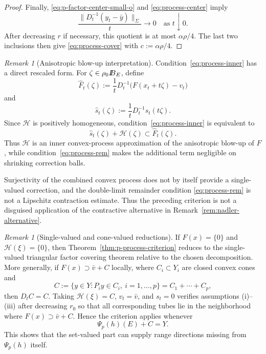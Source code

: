 \documentclass[11pt]{amsart}
\theoremstyle{definition}
\theoremstyle{remark}
\newtheorem{remark}[theorem]{Remark}
\newcommand{\by}{\bar y}
\newcommand{\bv}{\bar v}
\def\ball{{I\kern -.35em B}}
\begin{document}
\begin{proof}
		Finally, \eqref{eq:p-factor-center-small-o} and
		\eqref{eq:process-center} imply
		$$
		\frac{\|D_t^{-1}(y_t-\by)\|_{\Sigma}}{t}\to0
		\quad\text{as }t\downarrow0.
		$$
		After decreasing $r$ if necessary, this quotient is at most
		$\alpha\rho/4$.  The last two inclusions then give
		\eqref{eq:process-cover} with $c:=\alpha\rho/4$.
	\end{proof}
	
	\begin{remark}[Anisotropic blow-up interpretation]
		Condition~\eqref{eq:process-inner} has a direct rescaled form. For
		$\zeta\in\rho_0\ball_E$, define
		$$
		\widehat F_t(\zeta)
		:=
		\frac{1}{t}D_t^{-1}\bigl(F(x_t+t\zeta)-v_t\bigr)
		$$
		and
		$$
		\widehat s_t(\zeta)
		:=
		\frac{1}{t}D_t^{-1}s_t(t\zeta).
		$$
		Since $\mathcal H$ is positively homogeneous,
		condition~\eqref{eq:process-inner} is equivalent to
		$$
		\widehat s_t(\zeta)+\mathcal H(\zeta)
		\subset\widehat F_t(\zeta).
		$$
		Thus $\mathcal H$ is an inner convex-process approximation of the
		anisotropic blow-up of $F$, while condition~\eqref{eq:process-rem} makes the
		additional term negligible on shrinking correction balls.
	\end{remark}
	
	Surjectivity of the combined convex process does not by itself provide a
	single-valued correction, and the double-limit remainder condition
	\eqref{eq:process-rem} is not a Lipschitz contraction estimate.  Thus the
	preceding criterion is not a disguised application of the contractive
	alternative in Remark~\ref{rem:nadler-alternative}.
	
	\begin{remark}[Single-valued and cone-valued reductions]
		If $F(x)=\{0\}$ and $\mathcal H(\xi)=\{0\}$, then
		Theorem~\ref{thm:p-process-criterion} reduces to the single-valued
		triangular factor covering theorem relative to the chosen decomposition.
		More generally, if
		$F(x)\supset\bv+C$ locally, where
		$C_i\subset Y_i$ are closed convex cones and
		$$
		C:=\{y\in Y:P_i y\in C_i,\ i=1,\ldots,p\}
		=C_1+\cdots+C_p,
		$$
		then
		$D_tC=C$.  Taking $\mathcal H(\xi)=C$, $v_t=\bv$, and $s_t=0$
		verifies assumptions {\rm (i)}--{\rm (iii)} after decreasing $r_0$ so that
		all corresponding tubes lie in the neighborhood where
		$F(x)\supset\bv+C$. Hence the criterion
		applies whenever
		$$
		\Psi_p(h)(E)+C=Y.
		$$
		This shows that the set-valued part can supply range directions missing
		from $\Psi_p(h)$ itself.
	\end{remark}
	
\end{document}
